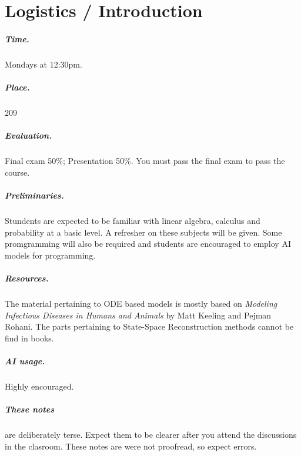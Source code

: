\chapter{Logistics / Introduction}

\paragraph{Time.} Mondays at 12:30pm.

\paragraph{Place.} 209

\paragraph{Evaluation.}
Final exam 50\%; Presentation 50\%. You must pass the final exam to
pass the course.

\paragraph{Preliminaries.}
Stundents are expected to be familiar with linear algebra, calculus
and probability at a basic level. A refresher on these subjects will
be given. Some promgramming will also be required and students are
encouraged to employ AI models for programming.

\paragraph{Resources.}
The material pertaining to ODE based models is mostly based on
\emph{Modeling Infectious Diseases in Humans and Animals} by Matt
Keeling and Pejman Rohani. The parts pertaining to State-Space
Reconstruction methods cannot be find in books.

\paragraph{AI usage.} Highly encouraged.

\paragraph{These notes}
are deliberately terse. Expect them to be clearer after you attend the
discussions in the clasroom. These notes are were not proofread, so
expect errors.
